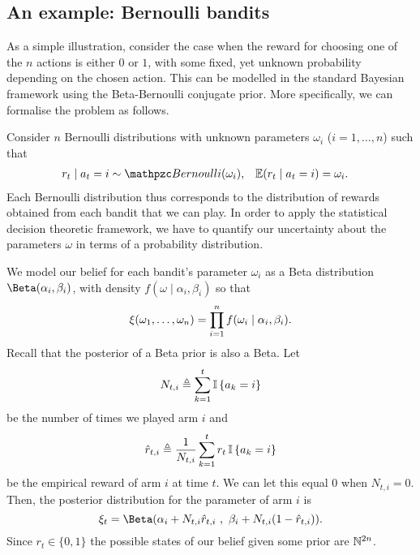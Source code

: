 \subsection{An example: Bernoulli bandits}
\label{sec:bernoulli-bandit-example}
As a simple illustration, consider the case when the reward for choosing one of the $n$ actions is either $0$ or $1$, with some fixed, yet unknown probability depending on the chosen action. This can be modelled in the standard Bayesian framework using the Beta-Bernoulli conjugate prior. More specifically, we can formalise the problem as follows.

Consider $n$ Bernoulli distributions with
unknown parameters $\omega_i$ ($i = 1, \ldots, n$) such that 
\begin{align}
  r_t \mid a_t = i &\sim
  \Bernoulli(\omega_i),
  &
  \E(r_t  \mid a_t = i) &= \omega_i.
\end{align}
Each Bernoulli distribution thus corresponds to the distribution of
rewards obtained from each bandit that we can play.  In order to
apply the statistical decision theoretic framework, we have to
quantify our uncertainty about the parameters $\omega$ in terms of a
probability distribution.

We model our belief for each bandit's
parameter $\omega_i$ as a Beta distribution $\Beta(\alpha_i,
\beta_i)$, with density $f(\omega \mid \alpha_i, \beta_i)$ so that
\[
\xi(\omega_1, \ldots, \omega_n)
=
\prod_{i=1}^n f(\omega_i \mid \alpha_i, \beta_i).
\]
Recall that the posterior of a Beta prior is also a Beta. Let
\[
N_{t,i} \mathrel{\triangleq} \sum_{k=1}^t \mathop{\mbox{\ensuremath{\mathbb{I}}}}\left\{a_k = i\right\}
\]
be the number of times we played arm $i$ and
\[
\hat{r}_{t,i} \mathrel{\triangleq} \frac{1}{N_{t,i}} \sum_{k=1}^t r_t \mathop{\mbox{\ensuremath{\mathbb{I}}}}\left\{a_k = i\right\}
\]
be the
\alert{empirical reward} of arm $i$ at time $t$. We
can let this equal $0$ when $N_{t,i} = 0$.
Then, the posterior distribution for the parameter of arm $i$ is
\[
\bel_t = \Beta(\alpha_i + N_{t,i} \hat{r}_{t,i}~,~ \beta_i + N_{t,i} (1 - \hat{r}_{t,i})).
\]
Since $r_t \in \{0,1\}$ the possible states of our belief given some
prior are ${\mathbb{N}}^{2n}$.

